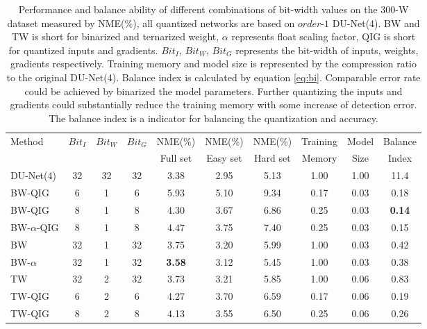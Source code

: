 \documentclass[runningheads]{llncs}
\begin{document}
\begin{table}[t!]
\begin{center}
\caption{Performance and balance ability of different combinations of bit-width values on the 300-W dataset measured by NME(\%), all quantized networks are based on $order$-$1$ DU-Net(4). BW and TW is short for binarized and ternarized weight, $\alpha$ represents float scaling factor, QIG is short for quantized inputs and gradients. $Bit_I$, $Bit_W$, $Bit_G$ represents the bit-width of inputs, weights, gradients respectively. Training memory and model size is represented by the compression ratio to the original DU-Net(4). Balance index is calculated by equation \ref{eq:bi}. Comparable error rate could be achieved by binarized the model parameters. Further quantizing the inputs and gradients could substantially reduce the training memory with some increase of detection error. The balance index is a indicator for balancing the quantization and accuracy.}


\small







\label{tb:IWG-QUAN}
\begin{tabular}{lccccccccc}
\toprule
\multirow{2}{*}{Method} & {$Bit_I$}  & $Bit_W$  & $Bit_G$ & NME(\%) & NME(\%) & NME(\%) & Training  &  Model & Balance\\
& & & & Full set & Easy set & Hard set & Memory & Size & Index\\

\hline
DU-Net(4)  &  32  & 32  & 32  & 3.38 & 2.95 & 5.13 & 1.00 & 1.00 & 11.4 \\
\hline
BW-QIG     &  6   & 1   & 6   & 5.93 & 5.10 & 9.34 & 0.17 & 0.03 & 0.18	\\
BW-QIG     &  8   & 1   & 8   & 4.30 & 3.67 & 6.86 & 0.25 & 0.03 & \bf{0.14}	    \\
BW-$\alpha$-QIG    &  8   & 1   & 8   & 4.47 & 3.75 & 7.40 & 0.25 & 0.03 & 0.15  \\
BW         &  32  & 1   & 32  & 3.75 & 3.20 & 5.99 & 1.00 & 0.03 & 0.42	\\
BW-$\alpha$        &  32  & 1   & 32  & {\bf 3.58} & 3.12 & 5.45 & 1.00 & 0.03 & 0.38  \\
TW         &  32  & 2   & 32  & 3.73 & 3.21 & 5.85 & 1.00 & 0.06 & 0.83  \\
TW-QIG     &  6   & 2   & 6   & 4.27 & 3.70 & 6.59 & 0.17 & 0.06 & 0.19	\\
TW-QIG     &  8   & 2   & 8   & 4.13 & 3.55 & 6.50 & 0.25 & 0.06 & 0.26   \\
\bottomrule
\end{tabular}

\end{center}
\end{table}
\end{document}
